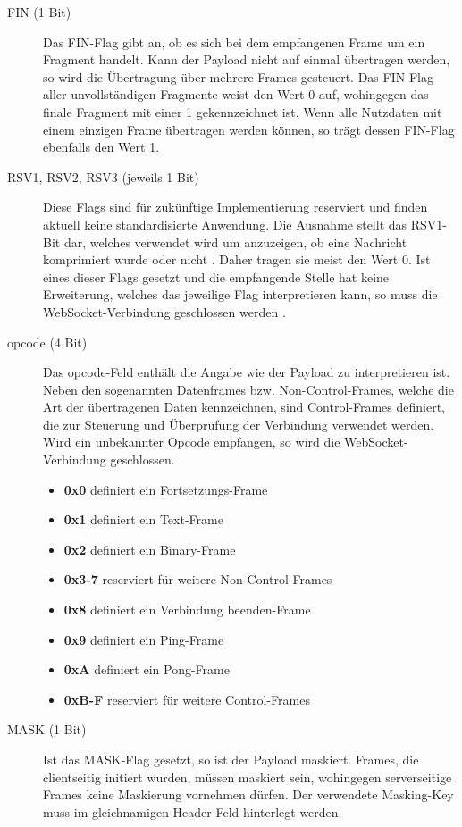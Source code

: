 \documentclass[11pt,a4paper,titlepage]{scrartcl}
\numberwithin{equation}{section}
\begin{document}
\begin{description}
	\item[FIN (1 Bit)] Das FIN-Flag gibt an, ob es sich bei dem empfangenen Frame um ein Fragment handelt. Kann der Payload nicht auf einmal übertragen werden, so wird die Übertragung über mehrere Frames gesteuert. Das FIN-Flag aller unvollständigen Fragmente weist den Wert 0 auf, wohingegen das finale Fragment mit einer 1 gekennzeichnet ist. Wenn alle Nutzdaten mit einem einzigen Frame übertragen werden können, so trägt dessen FIN-Flag ebenfalls den Wert 1.
	\item[RSV1, RSV2, RSV3 (jeweils 1 Bit)] Diese Flags sind für zukünftige Implementierung reserviert und finden aktuell keine standardisierte Anwendung. Die Ausnahme stellt das RSV1-Bit dar, welches verwendet wird um anzuzeigen, ob eine Nachricht komprimiert wurde oder nicht \autocite{internet_assigned_numbers_authority_websocket_2011}. Daher tragen sie meist den Wert 0. Ist eines dieser Flags gesetzt und die empfangende Stelle hat keine Erweiterung, welches das jeweilige Flag interpretieren kann, so muss die WebSocket-Verbindung geschlossen werden \autocite[27]{fette_websocket_2011}. 
	\item[opcode (4 Bit)] Das opcode-Feld enthält die Angabe wie der Payload zu interpretieren ist. Neben den sogenannten Datenframes bzw. Non-Control-Frames, welche die Art der übertragenen Daten kennzeichnen, sind Control-Frames definiert, die zur Steuerung und Überprüfung der Verbindung verwendet werden. Wird ein unbekannter Opcode empfangen, so wird die WebSocket-Verbindung geschlossen.
	\begin{itemize}
		\item \textbf{0x0} definiert ein Fortsetzungs-Frame
		\item \textbf{0x1} definiert ein Text-Frame
		\item \textbf{0x2} definiert ein Binary-Frame
		\item \textbf{0x3-7} reserviert für weitere Non-Control-Frames
		\item \textbf{0x8} definiert ein Verbindung beenden-Frame
		\item \textbf{0x9} definiert ein Ping-Frame
		\item \textbf{0xA} definiert ein Pong-Frame
		\item \textbf{0xB-F} reserviert für weitere Control-Frames
	\end{itemize}
	\item[MASK (1 Bit)] Ist das MASK-Flag gesetzt, so ist der Payload maskiert. Frames, die clientseitig initiert wurden, müssen maskiert sein, wohingegen serverseitige Frames keine Maskierung vornehmen dürfen. Der verwendete Masking-Key muss im gleichnamigen Header-Feld hinterlegt werden.

\end{description}
\end{document}
